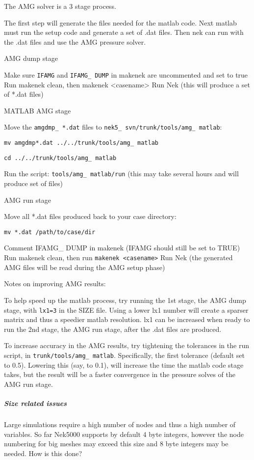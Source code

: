 The AMG solver is a 3 stage process. 

The first step will generate the files needed for the matlab code. Next matlab must run the setup code and generate a set of .dat files. Then nek can run with the .dat files and use the AMG pressure solver.

AMG dump stage

    Make sure {\tt IFAMG} and {\tt IFAMG\_ DUMP} in makenek are uncommented and set to true
    Run makenek clean, then makenek <casename>
    Run Nek (this will produce a set of *.dat files) 

MATLAB AMG stage

    Move the {\tt amgdmp\_ *.dat} files to {\tt nek5\_ svn/trunk/tools/amg\_ matlab}: 

    {\tt mv amgdmp*.dat ../../trunk/tools/amg\_ matlab}

    {\tt cd ../../trunk/tools/amg\_ matlab}

    Run the script: {\tt tools/amg\_ matlab/run} (this may take several hours and will produce set of files) 

AMG run stage

    Move all *.dat files produced back to your case directory: 

    {\tt mv *.dat /path/to/case/dir}

    Comment IFAMG\_ DUMP in makenek (IFAMG should still be set to TRUE)
    Run makenek clean, then run {\tt makenek <casename>}
    Run Nek (the generated AMG files will be read during the AMG setup phase) 

Notes on improving AMG results:

    To help speed up the matlab process, try running the 1st stage, the AMG dump stage, with {\tt lx1=3} in the SIZE file. Using a lower lx1 number will create a sparser matrix and thus a speedier matlab resolution. lx1 can be increased when ready to run the 2nd stage, the AMG run stage, after the .dat files are produced. 

    To increase accuracy in the AMG results, try tightening the tolerances in the run script, in {\tt trunk/tools/amg\_ matlab}. Specifically, the first tolerance (default set to 0.5). Lowering this (say, to 0.1), will increase the time the matlab code stage takes, but the result will be a faster convergence in the pressure solves of the AMG run stage. 

\subparagraph*{Size related issues}  

Large simulations require a high number of nodes and thus a high number of variables. So far Nek5000 supports by default 4 byte integers, however the node numbering for big meshes may exceed this size and 8 byte integers may be needed. How is this done?

